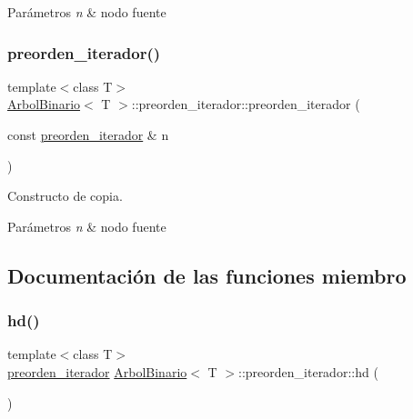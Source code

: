 \begin{DoxyParams}{Parámetros}
{\em n} & nodo fuente \\
\hline
\end{DoxyParams}
\mbox{\label{classArbolBinario_1_1preorden__iterador_a5986920ce2e2e8b86e1a32fcc831161d}} 
\subsubsection{\texorpdfstring{preorden\+\_\+iterador()}{preorden\_iterador()}\hspace{0.1cm}{\footnotesize\ttfamily [3/3]}}
{\footnotesize\ttfamily template$<$class T$>$ \\
\hyperlink{classArbolBinario}{Arbol\+Binario}$<$ T $>$\+::preorden\+\_\+iterador\+::preorden\+\_\+iterador (\begin{DoxyParamCaption}\item[{const \hyperlink{classArbolBinario_1_1preorden__iterador}{preorden\+\_\+iterador} \&}]{n }\end{DoxyParamCaption})\hspace{0.3cm}{\ttfamily [inline]}}



Constructo de copia. 


\begin{DoxyParams}{Parámetros}
{\em n} & nodo fuente \\
\hline
\end{DoxyParams}


\subsection{Documentación de las funciones miembro}
\mbox{\label{classArbolBinario_1_1preorden__iterador_a3bae3e50aa8ee51f6cf862efa9f56270}} 
\subsubsection{\texorpdfstring{hd()}{hd()}}
{\footnotesize\ttfamily template$<$class T$>$ \\
\hyperlink{classArbolBinario_1_1preorden__iterador}{preorden\+\_\+iterador} \hyperlink{classArbolBinario}{Arbol\+Binario}$<$ T $>$\+::preorden\+\_\+iterador\+::hd (\begin{DoxyParamCaption}{ }\end{DoxyParamCaption})\hspace{0.3cm}{\ttfamily [inline]}}



